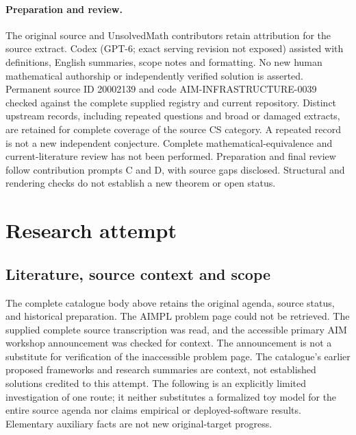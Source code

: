 \documentclass[11pt]{article}
\begin{document}
\paragraph{Preparation and review.}
The original source and UnsolvedMath contributors retain attribution for the source extract. Codex (GPT-6; exact serving revision not exposed) assisted with definitions, English summaries, scope notes and formatting. No new human mathematical authorship or independently verified solution is asserted. Permanent source ID 20002139 and code AIM-INFRASTRUCTURE-0039 checked against the complete supplied registry and current repository. Distinct upstream records, including repeated questions and broad or damaged extracts, are retained for complete coverage of the source CS category. A repeated record is not a new independent conjecture. Complete mathematical-equivalence and current-literature review has not been performed. Preparation and final review follow contribution prompts C and D, with source gaps disclosed. Structural and rendering checks do not establish a new theorem or open status.
\label{end:20002139}

\section{Research attempt}
\subsection{Literature, source context and scope}
The complete catalogue body above retains the original agenda, source status, and historical preparation. The AIMPL problem page could not be retrieved. The supplied complete source transcription was read, and the accessible primary AIM workshop announcement was checked for context. The announcement is not a substitute for verification of the inaccessible problem page. The catalogue's earlier proposed frameworks and research summaries are context, not established solutions credited to this attempt. The following is an explicitly limited investigation of one route; it neither substitutes a formalized toy model for the entire source agenda nor claims empirical or deployed-software results. Elementary auxiliary facts are not new original-target progress.
\end{document}

